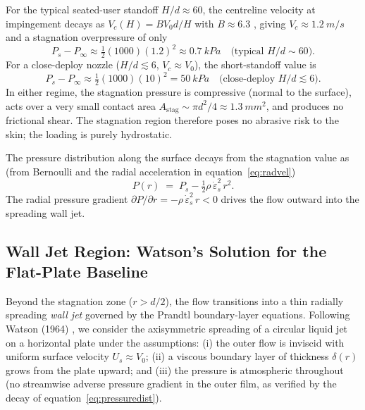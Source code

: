 \documentclass[10pt,letterpaper]{article}
\begin{document}
For the typical seated-user standoff $H/d \approx 60$, the centreline
velocity at impingement decays as $V_c(H) = B V_0 d/H$ with $B \approx 6.3$
\citep{PopeBook}, giving $V_c \approx 1.2~m/s$ and a stagnation
overpressure of only
\begin{equation}
    P_s - P_\infty \approx \tfrac{1}{2}(1000)(1.2)^2 \approx 0.7~kPa
    \quad \text{(typical $H/d \sim 60$)}.
    \label{eq:stagval}
\end{equation}
For a close-deploy nozzle ($H/d \lesssim 6$, $V_c \approx V_0$), the
short-standoff value is
\begin{equation}
    P_s - P_\infty \approx \tfrac{1}{2}(1000)(10)^2 = 50~kPa
    \quad \text{(close-deploy $H/d \lesssim 6$)}.
    \label{eq:stagshort}
\end{equation}
In either regime, the stagnation pressure is compressive (normal to the
surface), acts over a very small contact area
$A_\mathrm{stag} \sim \pi d^2/4 \approx 1.3~mm^2$, and produces no
frictional shear. The stagnation region therefore poses no abrasive risk to
the skin; the loading is purely hydrostatic.

The pressure distribution along the surface decays from the stagnation value
as (from Bernoulli and the radial acceleration in equation~\ref{eq:radvel})
\begin{equation}
    P(r) \;=\; P_s - \tfrac{1}{2}\rho\,\dot\varepsilon_s^2\,r^2.
    \label{eq:pressuredist}
\end{equation}
The radial pressure gradient
$\partial P/\partial r = -\rho\,\dot\varepsilon_s^2\,r < 0$
drives the flow outward into the spreading wall jet.

\subsection{Wall Jet Region: Watson's Solution for the Flat-Plate Baseline}
\label{subsec:watson}

Beyond the stagnation zone ($r > d/2$), the flow transitions into a thin
radially spreading \emph{wall jet} governed by the Prandtl boundary-layer
equations. Following Watson (1964) \citep{Watson1964}, we consider the
axisymmetric spreading of a circular liquid jet on a horizontal plate under
the assumptions: (i) the outer flow is inviscid with uniform surface velocity
$U_s \approx V_0$; (ii) a viscous boundary layer of thickness $\delta(r)$
grows from the plate upward; and (iii) the pressure is atmospheric throughout
(no streamwise adverse pressure gradient in the outer film, as verified
by the decay of equation~\ref{eq:pressuredist}).
\end{document}
